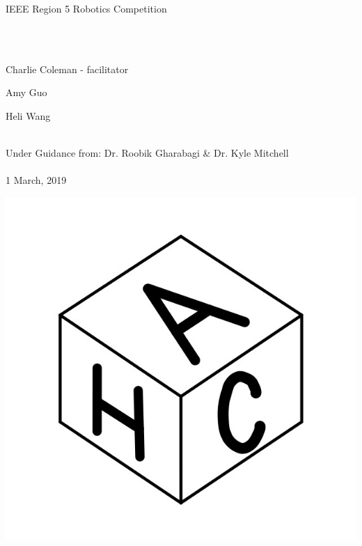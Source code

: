 \documentclass[12pt]{article}
\begin{document}
	
\vspace*{\fill}
\begin{center}

\begin{LARGE}IEEE Region 5 Robotics Competition\end{LARGE}~\\~\\


\begin{large}
Charlie Coleman - facilitator 

Amy Guo

Heli Wang\\~\\
\end{large}

Under Guidance from: Dr. Roobik Gharabagi \& Dr. Kyle Mitchell\\~\\

1 March, 2019

\includegraphics[scale=0.3]{logo}


\end{center}
\vspace*{\fill}
\end{document}
